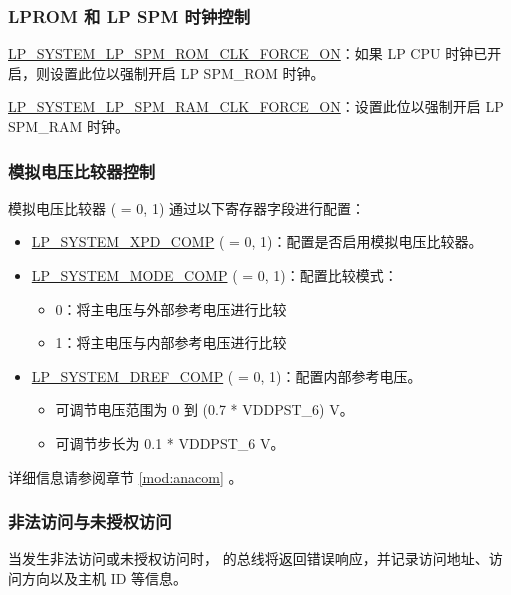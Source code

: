 \documentclass[main\_\_CN.tex]{subfiles}
\begin{document}
\subsubsection{LPROM 和 LP SPM 时钟控制}

\hyperref[fielddesc:LPSYSTEMLPSPMROMCLKFORCEON]{LP\_SYSTEM\_LP\_SPM\_ROM\_CLK\_FORCE\_ON}：如果 LP CPU 时钟已开启，则设置此位以强制开启 LP SPM\_ROM 时钟。

\hyperref[fielddesc:LPSYSTEMLPSPMRAMCLKFORCEON]{LP\_SYSTEM\_LP\_SPM\_RAM\_CLK\_FORCE\_ON}：设置此位以强制开启 LP SPM\_RAM 时钟。

\subsubsection{模拟电压比较器控制}
模拟电压比较器 ( = 0, 1) 通过以下寄存器字段进行配置：

\begin{itemize}
    \item \hyperref[fielddesc:LPSYSTEMXPDCOMP0]{LP\_SYSTEM\_XPD\_COMP} ( = 0, 1)：配置是否启用模拟电压比较器。
    \item \hyperref[fielddesc:LPSYSTEMMODECOMP0]{LP\_SYSTEM\_MODE\_COMP} ( = 0, 1)：配置比较模式：
        \begin{itemize}
            \item 0：将主电压与外部参考电压进行比较
            \item 1：将主电压与内部参考电压进行比较
        \end{itemize}
    \item \hyperref[fielddesc:LPSYSTEMDREFCOMP0]{LP\_SYSTEM\_DREF\_COMP} ( = 0, 1)：配置内部参考电压。
    \begin{itemize}
        \item 可调节电压范围为 0 到 (0.7 * VDDPST\_6) V。
        \item 可调节步长为 0.1 * VDDPST\_6 V。
    \end{itemize}
\end{itemize}

详细信息请参阅章节 \ref{mod:anacom} \textit{}。

\subsubsection{非法访问与未授权访问}

当发生非法访问或未授权访问时，\chipname{} 的总线将返回错误响应，并记录访问地址、访问方向以及主机 ID 等信息。
\end{document}
